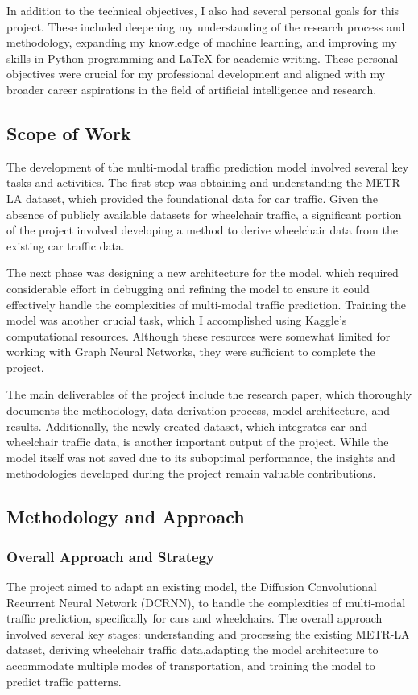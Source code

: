 In addition to the technical objectives, I also had several personal goals for this project.
These included deepening my understanding of the research process and methodology, expanding my knowledge of machine
learning, and improving my skills in Python programming and LaTeX for academic writing.
These personal objectives were crucial for my professional development and aligned with my broader career aspirations in
the field of artificial intelligence and research.

\subsection{Scope of Work}\label{subsec:scope-of-work}
The development of the multi-modal traffic prediction model involved several key tasks and activities.
The first step was obtaining and understanding the METR-LA dataset, which provided the foundational data for car
traffic.
Given the absence of publicly available datasets for wheelchair traffic, a significant portion of the project involved
developing a method to derive wheelchair data from the existing car traffic data.

The next phase was designing a new architecture for the model, which required considerable effort in debugging and
refining the model to ensure it could effectively handle the complexities of multi-modal traffic prediction.
Training the model was another crucial task, which I accomplished using Kaggle's computational resources.
Although these resources were somewhat limited for working with Graph Neural Networks, they were sufficient to complete
the project.

The main deliverables of the project include the research paper, which thoroughly documents the methodology, data
derivation process, model architecture, and results.
Additionally, the newly created dataset, which integrates car and wheelchair traffic data, is another important output
of the project.
While the model itself was not saved due to its suboptimal performance, the insights and methodologies developed during
the project remain valuable contributions.

\subsection{Methodology and Approach}\label{subsec:methodology-and-approach}

\subsubsection{Overall Approach and Strategy}\label{subsubsec:overall-approach-and-strategy}
The project aimed to adapt an existing model, the Diffusion Convolutional Recurrent Neural Network (DCRNN), to handle
the complexities of multi-modal traffic prediction, specifically for cars and wheelchairs.
The overall approach involved several key stages: understanding and processing the existing METR-LA dataset, deriving
wheelchair traffic data,adapting the model architecture to accommodate multiple modes of transportation, and training
the model to predict traffic patterns.

